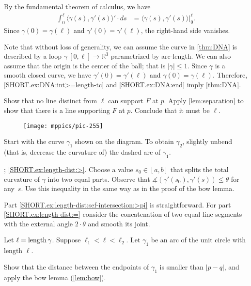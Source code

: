 \begin{multicols}{2}
By the fundamental theorem of calculus, we have
\begin{align*}
\int_0^\ell\langle\gamma(s),\gamma'(s)\rangle'\cdot ds
&=\langle\gamma(s),\gamma'(s)\rangle\bigg|_0^\ell.
\end{align*}
Since $\gamma(0)=\gamma(\ell)$ and $\gamma'(0)=\gamma'(\ell)$, the right-hand side vanishes.


Note that without loss of generality, we can assume the curve in \ref{thm:DNA} is described by a loop $\gamma\:[0,\ell]\to\mathbb{R}^3$ parametrized by arc-length.
We can also assume that the origin is the center of the ball; that is $|\gamma|\le 1$.
Since $\gamma$ is a smooth closed curve, we have 
$\gamma'(0)=\gamma'(\ell)$ and $\gamma(0)=\gamma(\ell)$.
Therefore, \ref{SHORT.ex:DNA:int>=length-tc} and \ref{SHORT.ex:DNA:end} imply \ref{thm:DNA}.

Show that no line distinct from $\ell$ can support $F$ at $p$. 
Apply \ref{lem:separation} to show that there is a line supporting $F$ at $p$.
Conclude that it must be $\ell$.

{

\begin{wrapfigure}{r}{22 mm}
\vskip-6mm
\centering
\texttt{[image: mppics/pic-255]}
\vskip0mm
\end{wrapfigure}

Start with the curve $\gamma_1$ shown on the diagram.
To obtain $\gamma_2$, slightly unbend (that is, decrease the curvature of) the dashed arc of $\gamma_1$.


\parbf{\ref{ex:length-dist}}; \ref{SHORT.ex:length-dist:>}.
Choose a value $s_0\in[a,b]$ that splits the total curvature of $\gamma$ into two equal parts.
Observe that $\measuredangle(\gamma'(s_0),\gamma'(s))\le \theta$ for any~$s$.
Use this inequality in the same way as in the proof of the bow lemma.

Part \ref{SHORT.ex:length-dist:sef-intersection:>pi} is straightforward.
For part \ref{SHORT.ex:length-dist:=} consider the concatenation of two equal line segments with the external angle $2\cdot\theta$ and smooth its joint. 


}

Let $\ell=\mathop{\rm length}\nolimits\gamma$.
Suppose $\ell_1<\ell<\ell_2$.
Let $\gamma_1$ be an arc of the unit circle with length $\ell$.

Show that the distance between the endpoints of $\gamma_1$ is smaller than $|p-q|$, and apply the bow lemma (\ref{lem:bow}).



\end{multicols}

